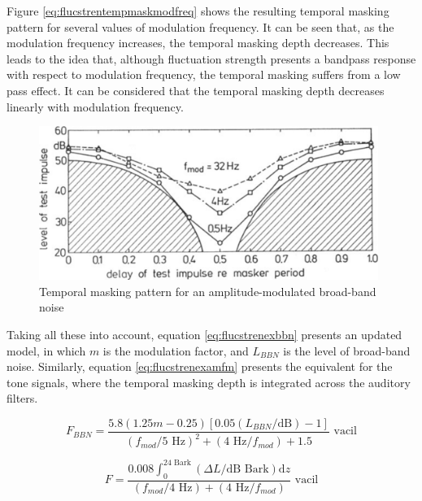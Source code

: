 Figure \ref{eq:flucstrentempmaskmodfreq} shows the resulting temporal masking
pattern for several values of modulation frequency. It can be seen that, as the
modulation frequency increases, the temporal masking depth decreases. This leads
to the idea that, although fluctuation strength presents a bandpass response
with respect to modulation frequency, the temporal masking suffers from a
low pass effect. It can be considered that the temporal masking depth decreases
linearly with modulation frequency.

\begin{figure}
    \centering
    \includegraphics[height=5cm]
        {img/FluctuationStrengthTemporalMasking}
    \caption{Temporal masking pattern for an amplitude-modulated broad-band
        noise \cite[pp. 255]{Fastl2007Psychoacoustics}}
    \label{fig:flucstrenmasking}
\end{figure}

Taking all these into account, equation \ref{eq:flucstrenexbbn} presents an
updated model, in which $m$ is the modulation factor, and $L_{BBN}$ is the level
of broad-band noise. Similarly, equation \ref{eq:flucstrenexamfm} presents the
equivalent for the tone signals, where the temporal masking depth is integrated
across the auditory filters.

\begin{equation}
    F_{BBN} = \frac{5.8(1.25m-0.25)[0.05(L_{BBN}/\text{dB})-1]}
        {(f_{mod}/5\text{ Hz})^2+(4\text{ Hz}/f_{mod})+1.5} \text{ vacil}
    \label{eq:flucstrenexbbn}
\end{equation}

\begin{equation}
    F = \frac{0.008 \int_0^{24\text{ Bark}}(\Delta L/\text{dB Bark})\mathrm{d}z}
        {(f_{mod}/4\text{ Hz})+(4\text{ Hz}/f_{mod})} \text{ vacil}
    \label{eq:flucstrenexamfm}
\end{equation}
